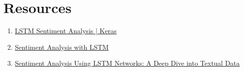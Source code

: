 \documentclass[11pt]{article}
\begin{document}
\section{Resources}
\begin{enumerate}
    \item \href{https://www.kaggle.com/code/ngyptr/lstm-sentiment-analysis-keras}{LSTM Sentiment Analysis | Keras}

    \item \href{https://www.analyticsvidhya.com/blog/2022/01/sentiment-analysis-with-lstm/}{Sentiment Analysis with LSTM}

    \item \href{https://javilopezcastillo.medium.com/sentiment-analysis-using-lstm-networks-a-deep-dive-into-textual-data-61cdd2e43dec}{Sentiment Analysis Using LSTM Networks: A Deep Dive into Textual Data}
\end{enumerate}
\end{document}
